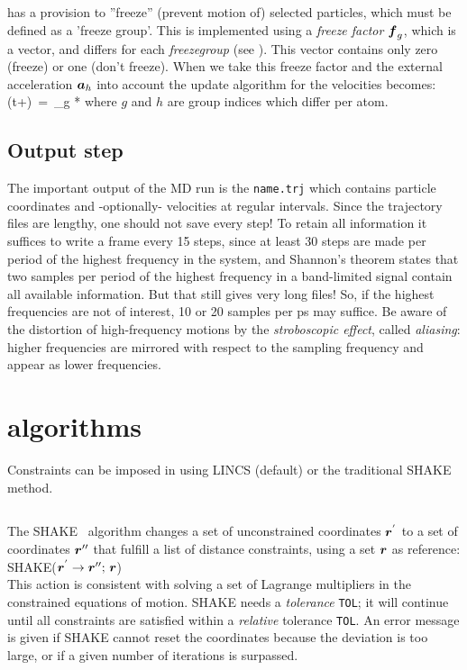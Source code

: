 {\gromacs} has a provision to ''freeze''  (prevent motion of) selected
particles, which must be defined as a 'freeze group'. This is implemented
using a {\em freeze factor $\mbox{\boldmath ${f}$}_g$}, which is a vector, and differs for each
{\em freezegroup} (see ). This vector contains only
zero (freeze) or one (don't freeze).
When we take this freeze factor and the external acceleration $\mbox{\boldmath ${a}$}_h$ into 
account the update algorithm for the velocities becomes:
\beq
{}(t+\hdt)~=~_g * \lambda * 
\eeq
where $g$ and $h$ are group indices which differ per atom.

\subsection{Output step}
The important output of the MD run is the {\em
{}} \verb'name.trj' which contains particle coordinates
and -optionally- velocities at regular intervals. Since the trajectory
files are lengthy, one should not save every step! To retain all
information it suffices to write a frame every 15 steps, since at
least 30 steps are made per period of the highest frequency in the
system, and Shannon's  theorem states that two samples per
period of the highest frequency in a band-limited signal contain all
available information. But that still gives very long files! So, if
the highest frequencies are not of interest, 10 or 20 samples per ps
may suffice. Be aware of the distortion of high-frequency motions by
the {\em stroboscopic effect}, called {\em aliasing}: higher frequencies
are  mirrored with respect to the sampling frequency and appear as
lower frequencies. 


\section{ algorithms}
Constraints can be imposed in {\gromacs} using LINCS (default) or
the traditional SHAKE method.

\subsection{}
The SHAKE~\cite{Ryckaert77} algorithm changes a set of unconstrained
coordinates $\mbox{\boldmath ${r}$}^{'}$ to a set of coordinates $\mbox{\boldmath ${r}$}''$ that
fulfill a  list of distance constraints, using a set $\mbox{\boldmath ${r}$}$ as
reference: \\[1ex] 
\hspace*{5em} SHAKE($\mbox{\boldmath ${r}$}^{'} \rightarrow  \mbox{\boldmath ${r}$}'';\,  \mbox{\boldmath ${r}$}$) \\[1ex]
This action is consistent with solving a set of Lagrange multipliers
in the constrained equations of motion. SHAKE needs a {\em tolerance}
\verb'TOL'; it will continue until all constraints are satisfied
within a {\em relative} tolerance \verb'TOL'. An error message is
given if SHAKE cannot reset the coordinates because the deviation is
too large, or if a given number of iterations is surpassed. 

